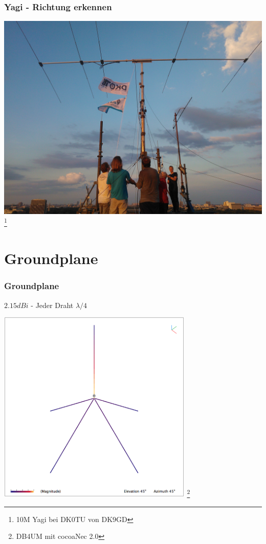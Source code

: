 \begin{frame}
    \frametitle{Yagi - Richtung erkennen}
    \begin{center}
        \includegraphics[width=.9\textwidth]{e11/yagi.jpg}
        \footnote{\tiny 10M Yagi bei DK0TU von DK9GD}
	\end{center}
\end{frame}


\section*{Groundplane}

\begin{frame}
    \frametitle{Groundplane}
    $2.15dBi$ - Jeder Draht $\lambda / 4$
    \begin{center}
        \includegraphics[width=0.7\textwidth]{e11/GP-DB4UM.png}
        \footnote{\tiny DB4UM mit cocoaNec 2.0}
	\end{center}
\end{frame}

